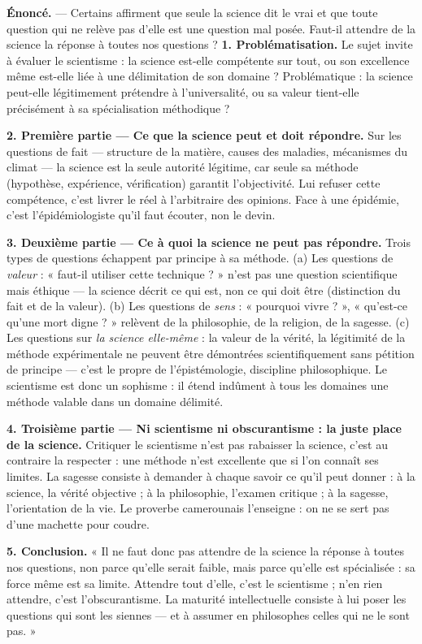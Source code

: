 \documentclass[11pt]{article}
\newcommand{\cle}[1]{{\popxbold\color{popdark}#1}}
\begin{document}
\begin{exoresolu}
\textbf{Énoncé.} — Certains affirment que seule la science dit le vrai et que toute question qui ne relève pas d'elle est une question mal posée. Faut-il attendre de la science la réponse à toutes nos questions ?
\tcblower
\textbf{1. Problématisation.} Le sujet invite à évaluer le \cle{scientisme} : la science est-elle compétente sur tout, ou son excellence même est-elle liée à une délimitation de son domaine ? Problématique : la science peut-elle légitimement prétendre à l'universalité, ou sa valeur tient-elle précisément à sa spécialisation méthodique ?

\textbf{2. Première partie — Ce que la science peut et doit répondre.} Sur les questions de fait — structure de la matière, causes des maladies, mécanismes du climat — la science est la seule autorité légitime, car seule sa méthode (hypothèse, expérience, vérification) garantit l'objectivité. Lui refuser cette compétence, c'est livrer le réel à l'arbitraire des opinions. Face à une épidémie, c'est l'épidémiologiste qu'il faut écouter, non le devin.

\textbf{3. Deuxième partie — Ce à quoi la science ne peut pas répondre.} Trois types de questions échappent par principe à sa méthode. (a) Les questions de \emph{valeur} : « faut-il utiliser cette technique ? » n'est pas une question scientifique mais éthique — la science décrit ce qui est, non ce qui doit être (distinction du fait et de la valeur). (b) Les questions de \emph{sens} : « pourquoi vivre ? », « qu'est-ce qu'une mort digne ? » relèvent de la philosophie, de la religion, de la sagesse. (c) Les questions sur \emph{la science elle-même} : la valeur de la vérité, la légitimité de la méthode expérimentale ne peuvent être démontrées scientifiquement sans pétition de principe — c'est le propre de l'\cle{épistémologie}, discipline philosophique. Le scientisme est donc un sophisme : il étend indûment à tous les domaines une méthode valable dans un domaine délimité.

\textbf{4. Troisième partie — Ni scientisme ni obscurantisme : la juste place de la science.} Critiquer le scientisme n'est pas rabaisser la science, c'est au contraire la respecter : une méthode n'est excellente que si l'on connaît ses limites. La sagesse consiste à demander à chaque savoir ce qu'il peut donner : à la science, la vérité objective ; à la philosophie, l'examen critique ; à la sagesse, l'orientation de la vie. Le proverbe camerounais l'enseigne : on ne se sert pas d'une machette pour coudre.

\textbf{5. Conclusion.} « Il ne faut donc pas attendre de la science la réponse à toutes nos questions, non parce qu'elle serait faible, mais parce qu'elle est spécialisée : sa force même est sa limite. Attendre tout d'elle, c'est le scientisme ; n'en rien attendre, c'est l'obscurantisme. La maturité intellectuelle consiste à lui poser les questions qui sont les siennes — et à assumer en philosophes celles qui ne le sont pas. »
\end{exoresolu}
\end{document}

